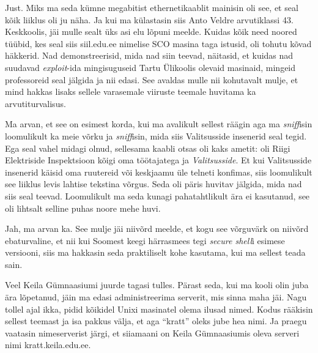 
Just. Miks ma seda kümne megabitist ethernetikaablit mainisin oli see, et seal 
kõik liiklus oli ju näha. Ja kui ma külastasin siis Anto 
Veldre arvutiklassi 43. 
Keskkoolis,  jäi mulle sealt üks asi elu 
lõpuni meelde. Kuidas kõik need noored tüübid, kes seal siis 
siil.edu.ee nimelise SCO masina 
taga istusid, oli tohutu kõvad häkkerid. Nad demonstreerisid, mida nad siin 
teevad, näitasid, et kuidas nad  suudavad \emph{exploit}-ida mingisuguseid Tartu 
Ülikoolis olevaid masinaid\label{sisu!ylikooli_root}, mingeid professoreid seal jälgida ja nii edasi. See 
avaldas mulle nii kohutavalt mulje, et mind hakkas lisaks sellele varasemale 
viiruste teemale huvitama ka arvutiturvalisus.

Ma arvan, et see on esimest korda, kui ma avalikult sellest räägin aga ma 
\emph{sniff}isin loomulikult ka meie  võrku ja \emph{sniff}isin, mida siis 
Valitsusside insenerid seal tegid. Ega seal vahel midagi 
olnud,  sellesama  kaabli otsas oli kaks ametit: oli Riigi Elektriside 
Inspektsioon kõigi oma töötajatega ja 
\emph{Valitsusside}. Et kui Valitsusside insenerid käisid oma ruutereid või 
keskjaamu üle telneti konfimas, siis loomulikult see liiklus levis lahtise 
tekstina võrgus. Seda oli päris huvitav jälgida, mida nad siis seal teevad.  
Loomulikult ma seda kunagi pahatahtlikult ära ei kasutanud, see oli lihtsalt 
selline puhas  noore mehe huvi.


Jah, ma arvan ka. See mulje jäi niivõrd meelde, et kogu see võrguvärk on 
niivõrd ebaturvaline, et nii kui Soomest keegi härrasmees tegi 
\emph{secure shell}i esimese versiooni, siis ma hakkasin seda praktiliselt kohe 
kasutama, kui ma sellest teada sain. 

Veel Keila Gümnaasiumi juurde tagasi tulles. 
Pärast seda, kui ma kooli olin juba ära lõpetanud,  jäin ma edasi 
administreerima serverit, mis sinna maha jäi. Nagu tollel ajal ikka,  pidid 
kõikidel Unixi masinatel  olema ilusad nimed. Kodus rääkisin sellest teemast ja 
isa pakkus välja, et aga \enquote{kratt} oleks jube hea nimi. Ja praegu 
vaatasin nimeserverist järgi, et siiamaani on Keila Gümnaasiumis oleva serveri 
nimi kratt.keila.edu.ee.

